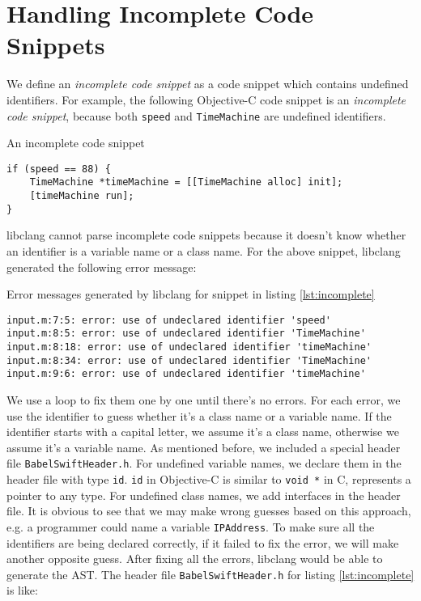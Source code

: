 \documentclass{sfuthesis}
\begin{document}

\section{Handling Incomplete Code Snippets}

We define an \emph{incomplete code snippet} as a code snippet which contains undefined identifiers. For example, the following Objective-C code snippet is an \emph{incomplete code snippet}, because both \texttt{speed} and \texttt{TimeMachine} are undefined identifiers.

\begin{listing}
\caption{An incomplete code snippet}
\label{lst:incomplete}
\begin{verbatim}
if (speed == 88) {
    TimeMachine *timeMachine = [[TimeMachine alloc] init];
    [timeMachine run];
}
\end{verbatim}
\end{listing}

libclang cannot parse incomplete code snippets because it doesn't know whether an identifier is a variable name or a class name. For the above snippet, libclang generated the following error message:

\begin{listing}
\caption{Error messages generated by libclang for snippet in listing \ref{lst:incomplete}}
\begin{verbatim}
input.m:7:5: error: use of undeclared identifier 'speed'
input.m:8:5: error: use of undeclared identifier 'TimeMachine'
input.m:8:18: error: use of undeclared identifier 'timeMachine'
input.m:8:34: error: use of undeclared identifier 'TimeMachine'
input.m:9:6: error: use of undeclared identifier 'timeMachine'
\end{verbatim}
\end{listing}

We use a loop to fix them one by one until there's no errors. For each error, we use the identifier to guess whether it's a class name or a variable name. If the identifier starts with a capital letter, we assume it's a class name, otherwise we assume it's a variable name.
As mentioned before, we included a special header file \texttt{BabelSwiftHeader.h}. For undefined variable names, we declare them in the header file with type \texttt{id}. \texttt{id} in Objective-C is similar to \texttt{void *} in C, represents a pointer to any type. For undefined class names, we add interfaces in the header file. It is obvious to see that we may make wrong guesses based on this approach, e.g. a programmer could name a variable \texttt{IPAddress}. To make sure all the identifiers are being declared correctly, if it failed to fix the error, we will make another opposite guess. After fixing all the errors, libclang would be able to generate the AST. The header file \texttt{BabelSwiftHeader.h} for listing \ref{lst:incomplete} is like:
\end{document}
